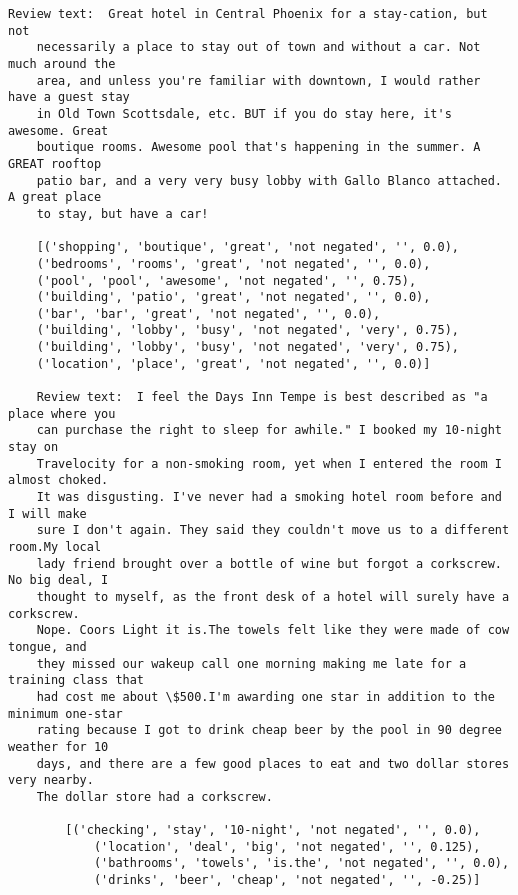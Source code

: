 \documentclass[11pt]{article}
\begin{document}
\begin{Verbatim}[commandchars=\\\{\}]
    Review text:  Great hotel in Central Phoenix for a stay-cation, but not
    necessarily a place to stay out of town and without a car. Not much around the
    area, and unless you're familiar with downtown, I would rather have a guest stay
    in Old Town Scottsdale, etc. BUT if you do stay here, it's awesome. Great
    boutique rooms. Awesome pool that's happening in the summer. A GREAT rooftop
    patio bar, and a very very busy lobby with Gallo Blanco attached. A great place
    to stay, but have a car!

    [('shopping', 'boutique', 'great', 'not negated', '', 0.0),
    ('bedrooms', 'rooms', 'great', 'not negated', '', 0.0),
    ('pool', 'pool', 'awesome', 'not negated', '', 0.75),
    ('building', 'patio', 'great', 'not negated', '', 0.0),
    ('bar', 'bar', 'great', 'not negated', '', 0.0),
    ('building', 'lobby', 'busy', 'not negated', 'very', 0.75),
    ('building', 'lobby', 'busy', 'not negated', 'very', 0.75),
    ('location', 'place', 'great', 'not negated', '', 0.0)]

    Review text:  I feel the Days Inn Tempe is best described as "a place where you
    can purchase the right to sleep for awhile." I booked my 10-night stay on
    Travelocity for a non-smoking room, yet when I entered the room I almost choked.
    It was disgusting. I've never had a smoking hotel room before and I will make
    sure I don't again. They said they couldn't move us to a different room.My local
    lady friend brought over a bottle of wine but forgot a corkscrew. No big deal, I
    thought to myself, as the front desk of a hotel will surely have a corkscrew.
    Nope. Coors Light it is.The towels felt like they were made of cow tongue, and
    they missed our wakeup call one morning making me late for a training class that
    had cost me about \$500.I'm awarding one star in addition to the minimum one-star
    rating because I got to drink cheap beer by the pool in 90 degree weather for 10
    days, and there are a few good places to eat and two dollar stores very nearby.
    The dollar store had a corkscrew.

        [('checking', 'stay', '10-night', 'not negated', '', 0.0),
            ('location', 'deal', 'big', 'not negated', '', 0.125),
            ('bathrooms', 'towels', 'is.the', 'not negated', '', 0.0),
            ('drinks', 'beer', 'cheap', 'not negated', '', -0.25)]
\end{Verbatim}
\end{document}
